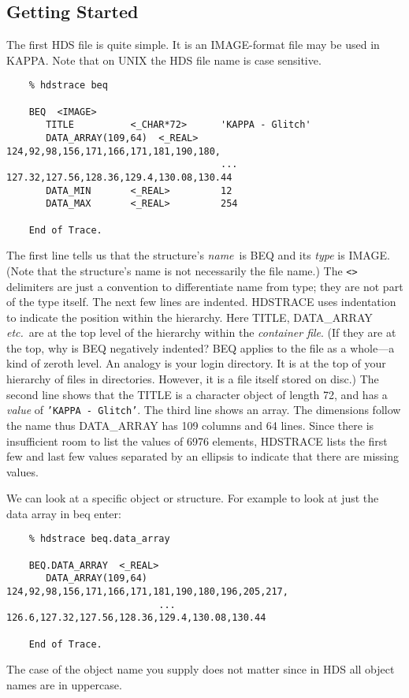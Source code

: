 \subsection{Getting Started}
The first HDS file is quite simple.  It is an IMAGE-format file may be
used in {\footnotesize KAPPA}.  Note that on UNIX the HDS file name
is case sensitive.  

\small
\begin{verbatim}
    % hdstrace beq
  
    BEQ  <IMAGE>
       TITLE          <_CHAR*72>      'KAPPA - Glitch'
       DATA_ARRAY(109,64)  <_REAL>    124,92,98,156,171,166,171,181,190,180,
                                      ... 127.32,127.56,128.36,129.4,130.08,130.44
       DATA_MIN       <_REAL>         12
       DATA_MAX       <_REAL>         254
                                                                              
    End of Trace.
\end{verbatim}
\normalsize
The first line tells us that the structure's {\em name}\ is BEQ and its
{\em type\/} is IMAGE.  (Note that the structure's name is not
necessarily the file name.)  The {\tt <>} delimiters are just a
convention to differentiate name from type; they are not part of the
type itself.  The next few lines are indented.  {\footnotesize HDSTRACE}
uses indentation to indicate the position within the hierarchy.  Here
TITLE, DATA\_ARRAY {\it etc.}\ are at the top level of the hierarchy
within the {\em container file}.  (If they are at the top, why is BEQ
negatively indented?  BEQ applies to the file as a whole---a kind of
zeroth level. An analogy is your login directory.  It is at the top of
your hierarchy of files in directories.  However, it is a file itself
stored on disc.) The second line shows that the TITLE is a character
object of length 72, and has a {\em value\/} of {\tt 'KAPPA - Glitch'}.
The third line shows an array.  The dimensions follow the name thus
DATA\_ARRAY has 109 columns and 64 lines.  Since there is insufficient
room to list the values of 6976 elements, {\footnotesize HDSTRACE} lists
the first few and last few values separated by an ellipsis to indicate
that there are missing values. 

We can look at a specific object or structure.  For example to look
at just the data array in beq enter:

\small
\begin{verbatim}
    % hdstrace beq.data_array
   
    BEQ.DATA_ARRAY  <_REAL>
       DATA_ARRAY(109,64)  124,92,98,156,171,166,171,181,190,180,196,205,217,
                           ... 126.6,127.32,127.56,128.36,129.4,130.08,130.44
                                                                              
    End of Trace.
\end{verbatim}
\normalsize
The case of the object name you supply does not matter since in HDS all
object names are in uppercase.

